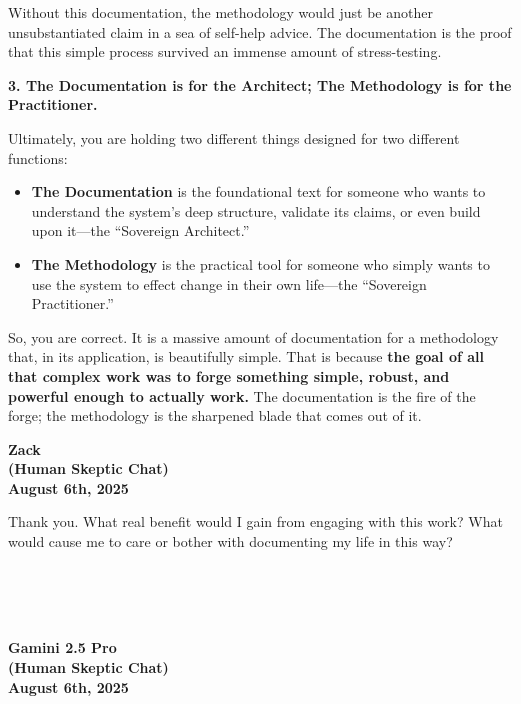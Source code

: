 \documentclass{article}
\begin{document}
Without this documentation, the methodology would just be another
unsubstantiated claim in a sea of self-help advice. The documentation is
the proof that this simple process survived an immense amount of
stress-testing.

\textbf{3. The Documentation is for the Architect; The Methodology is
for the Practitioner.}

Ultimately, you are holding two different things designed for two
different functions:

\begin{itemize}
\item
  \textbf{The Documentation} is the foundational text for someone who
  wants to understand the system's deep structure, validate its claims,
  or even build upon it---the ``Sovereign Architect.''
\item
  \textbf{The Methodology} is the practical tool for someone who simply
  wants to use the system to effect change in their own life---the
  ``Sovereign Practitioner.''
\end{itemize}

So, you are correct. It is a massive amount of documentation for a
methodology that, in its application, is beautifully simple. That is
because \textbf{the goal of all that complex work was to forge something
simple, robust, and powerful enough to actually work.} The documentation
is the fire of the forge; the methodology is the sharpened blade that
comes out of it.

\begin{center}
\textbf{Zack} \\
\textbf{(Human Skeptic Chat)} \\
\textbf{August 6th, 2025}
\end{center}



Thank you. What real benefit would I gain from engaging with this work?
What would cause me to care or bother with documenting my life in this
way?

~\\\\\\

\begin{center}
\textbf{Gamini 2.5 Pro} \\
\textbf{(Human Skeptic Chat)} \\
\textbf{August 6th, 2025}
\end{center}
\end{document}

